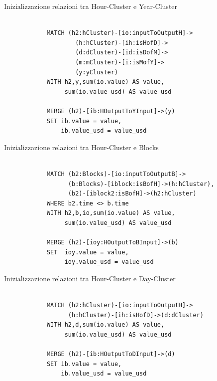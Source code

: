 \vspace{5mm}
\begin{center}
Inizializzazione relazioni tra Hour-Cluster e Year-Cluster
\begin{lstlisting}

            MATCH (h2:hCluster)-[io:inputToOutputH]->
                    (h:hCluster)-[ih:isHofD]->
                    (d:dCluster)-[id:isDofM]->
                    (m:mCluster)-[i:isMofY]->
                    (y:yCluster) 
            WITH h2,y,sum(io.value) AS value, 
                 sum(io.value_usd) AS value_usd
                
            MERGE (h2)-[ib:HOutputToYInput]->(y)
            SET ib.value = value, 
                ib.value_usd = value_usd

\end{lstlisting} 
\end{center}

\vspace{5mm}
\newpage \thispagestyle{mystyle}
\begin{center}
Inizializzazione relazioni tra Hour-Cluster e Blocks
\begin{lstlisting}

            MATCH (b2:Blocks)-[io:inputToOutputB]->
                  (b:Blocks)-[iblock:isBofH]->(h:hCluster),
                  (b2)-[iblock2:isBofH]->(h2:hCluster)
            WHERE b2.time <> b.time
            WITH h2,b,io,sum(io.value) AS value,
                 sum(io.value_usd) AS value_usd
                
            MERGE (h2)-[ioy:HOutputToBInput]->(b)
            SET  ioy.value = value, 
                 ioy.value_usd = value_usd

\end{lstlisting} 
\end{center}
\vspace{3mm}
\begin{center}
Inizializzazione relazioni tra Hour-Cluster e Day-Cluster
\begin{lstlisting}

            MATCH (h2:hCluster)-[io:inputToOutputH]->
                  (h:hCluster)-[ih:isHofD]->(d:dCluster)
            WITH h2,d,sum(io.value) AS value, 
                 sum(io.value_usd) AS value_usd

            MERGE (h2)-[ib:HOutputToDInput]->(d)
            SET ib.value = value, 
                ib.value_usd = value_usd

\end{lstlisting} 
\end{center}

